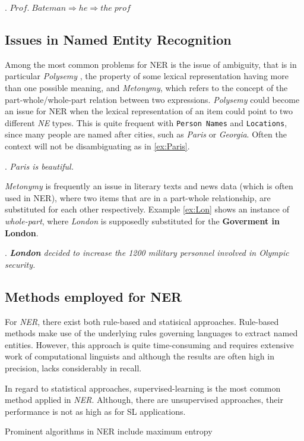 \documentclass[11pt]{article}
\begin{document}
\ex. $ Prof.\; Bateman \Rightarrow he \Rightarrow the \; prof$


\subsection*{Issues in Named Entity Recognition}
Among the most common problems for NER is the issue of ambiguity, that is in particular \emph{Polysemy} \cite{ner-sekine2007}, 
the property of some lexical representation having
more than one possible meaning, and \emph{Metonymy}, which refers to the concept of the part-whole/whole-part relation between two expressions. 
\emph{Polysemy} could become an issue for NER when the lexical representation of an item could point to two different \emph{NE} types.
This is quite frequent with \texttt{Person Names} and \texttt{Locations}, since many people are named after cities, such as \emph{Paris} or \emph{Georgia}. 
Often the context will not be disambiguating as in \ref{ex:Paris}.

\ex. \emph{Paris is beautiful.} \label{ex:Paris}

\emph{Metonymy} is frequently an issue in literary texts and news data (which is often used in NER), where two items that are in a part-whole
relationship, are substituted for each other respectively. Example \ref{ex:Lon} shows an instance of \emph{whole-part}, where \emph{London} is supposedly substituted
for the \textbf{Goverment in London}. 

\ex. \emph{\textbf{London} decided to increase the 1200 military personnel involved in Olympic security.} \label{ex:Lon}

\subsection*{Methods employed for NER}
For \emph{NER}, there exist both rule-based and statisical approaches. 
Rule-based methods make use of the underlying rules governing languages to extract named entities. 
However, this approach is quite time-consuming and requires extensive work of computational linguists \cite{ner-sekine2007}
and although the results are 
often high in precision, lacks considerably in recall.

In regard to statistical approaches, supervised-learning is the most common method applied in \emph{NER}. Although, there are unsupervised approaches, 
their performance is not as high as for SL applications.

Prominent algorithms in NER include maximum entropy
% 
\end{document}

